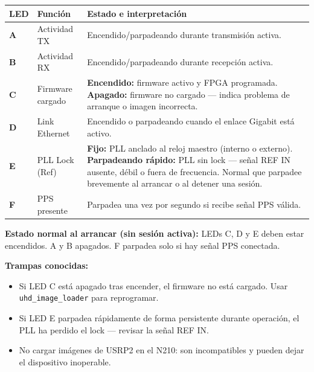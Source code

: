 \documentclass[11pt]{article}
\begin{document}
\begin{table}[h]
    \centering
    \begin{tabular}{p{}p{}p{}}
        \toprule
        \textbf{LED} & \textbf{Función} & \textbf{Estado e interpretación} \\
        \midrule
        \textbf{A} & Actividad TX & Encendido/parpadeando durante transmisión activa. \\
        \addlinespace
        \textbf{B} & Actividad RX & Encendido/parpadeando durante recepción activa. \\
        \addlinespace
        \textbf{C} & Firmware cargado & \textbf{Encendido:} firmware activo y FPGA programada. \textbf{Apagado:} firmware no cargado — indica problema de arranque o imagen incorrecta. \\
        \addlinespace
        \textbf{D} & Link Ethernet & Encendido o parpadeando cuando el enlace Gigabit está activo. \\
        \addlinespace
        \textbf{E} & PLL Lock (Ref) & \textbf{Fijo:} PLL anclado al reloj maestro (interno o externo). \textbf{Parpadeando rápido:} PLL sin lock — señal REF IN ausente, débil o fuera de frecuencia. Normal que parpadee brevemente al arrancar o al detener una sesión. \\
        \addlinespace
        \textbf{F} & PPS presente & Parpadea una vez por segundo si recibe señal PPS válida. \\
        \bottomrule
    \end{tabular}
\end{table}

\textbf{Estado normal al arrancar (sin sesión activa):} LEDs C, D y E deben estar encendidos. A y B apagados. F parpadea solo si hay señal PPS conectada.

\textbf{Trampas conocidas:}
\begin{itemize}
    \item Si LED C está apagado tras encender, el firmware no está cargado. Usar \texttt{uhd\_image\_loader} para reprogramar.
    \item Si LED E parpadea rápidamente de forma persistente durante operación, el PLL ha perdido el lock — revisar la señal REF IN.
    \item No cargar imágenes de USRP2 en el N210: son incompatibles y pueden dejar el dispositivo inoperable.
\end{itemize}

\end{document}
